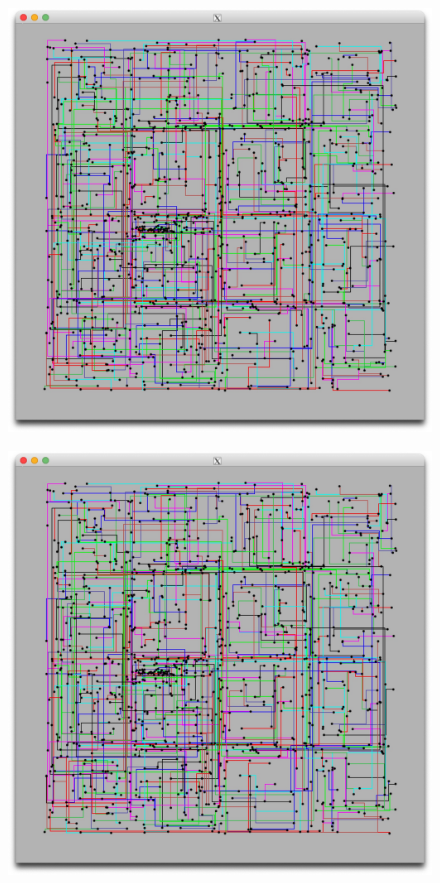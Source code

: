 \documentclass[letterpaper,11pt]{exam}
\begin{document}
\begin{questions}
    \begin{figure}[h]
        \hspace{1cm}
        \begin{minipage}{0.4\textwidth}
            \centering
            \includegraphics[width=\textwidth]{img/medium_4096_8_A.jpg}
            \label{fig:question1a}
            \vspace{-0.5cm}
        \end{minipage}
        \hspace{0.2cm}
        \begin{minipage}{0.4\textwidth}
            \centering
            \includegraphics[width=\textwidth]{img/medium_4096_8_W.jpg}

\end{minipage}
\end{figure}
\end{questions}
\end{document}
